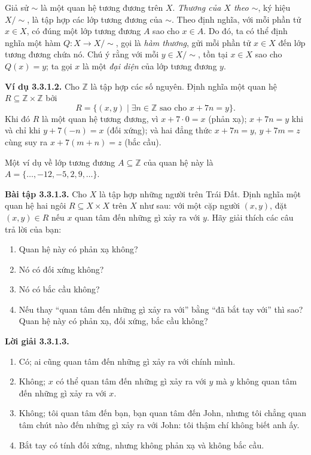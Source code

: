 Giả sử $\sim$ là một quan hệ tương đương trên $X$. \emph{Thương của $X$ theo $\sim$}, ký hiệu $X/{\sim}$, là tập hợp các lớp tương đương của $\sim$. Theo định nghĩa, với mỗi phần tử $x\in X$, có đúng một lớp tương đương $A$ sao cho $x\in A$. Do đó, ta có thể định nghĩa một hàm $Q:X\to X/{\sim}$, gọi là \emph{hàm thương}, gửi mỗi phần tử $x\in X$ đến lớp tương đương chứa nó. Chú ý rằng với mỗi $y\in X/{\sim}$, tồn tại $x\in X$ sao cho $Q(x)=y$; ta gọi $x$ là một \emph{đại diện} của lớp tương đương $y$.

\noindent\textbf{Ví dụ 3.3.1.2.} Cho $\mathbb Z$ là tập hợp các số nguyên. Định nghĩa một quan hệ $R\subseteq\mathbb Z\times\mathbb Z$ bởi
\[R=\{(x,y)\mid\exists n\in\mathbb Z\text{ sao cho }x+7n=y\}.\]
Khi đó $R$ là một quan hệ tương đương, vì $x+7\cdot0=x$ (phản xạ); $x+7n=y$ khi và chỉ khi $y+7(-n)=x$ (đối xứng); và hai đẳng thức $x+7n=y$, $y+7m=z$ cùng suy ra $x+7(m+n)=z$ (bắc cầu).

Một ví dụ về lớp tương đương $A\subseteq\mathbb Z$ của quan hệ này là $A=\{\ldots,\allowbreak-12,\allowbreak-5,\allowbreak2,\allowbreak9,\allowbreak\ldots\}$.

\noindent\textbf{Bài tập 3.3.1.3.} Cho $X$ là tập hợp những người trên Trái Đất. Định nghĩa một quan hệ hai ngôi $R\subseteq X\times X$ trên $X$ như sau: với một cặp người $(x,y)$, đặt $(x,y)\in R$ nếu $x$ quan tâm đến những gì xảy ra với $y$. Hãy giải thích các câu trả lời của bạn:
\begin{enumerate}[label=\alph*.]
\item Quan hệ này có phản xạ không?
\item Nó có đối xứng không?
\item Nó có bắc cầu không?
\item Nếu thay ``quan tâm đến những gì xảy ra với'' bằng ``đã bắt tay với'' thì sao? Quan hệ này có phản xạ, đối xứng, bắc cầu không?
\end{enumerate}
\noindent\textbf{Lời giải 3.3.1.3.}\keepwithnext
\begin{enumerate}[label=\alph*.]
\item Có; ai cũng quan tâm đến những gì xảy ra với chính mình.
\item Không; $x$ có thể quan tâm đến những gì xảy ra với $y$ mà $y$ không quan tâm đến những gì xảy ra với $x$.
\item Không; tôi quan tâm đến bạn, bạn quan tâm đến John, nhưng tôi chẳng quan tâm chút nào đến những gì xảy ra với John: tôi thậm chí không biết anh ấy.
\item Bắt tay có tính đối xứng, nhưng không phản xạ và không bắc cầu.
\end{enumerate}

